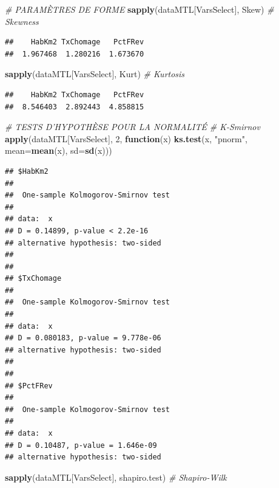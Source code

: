 \documentclass[
  11pt,
  french,
]{book}
\makeatletter
\newenvironment{Shaded}{\begin{snugshade}}{\end{snugshade}}
\newcommand{\CommentTok}[1]{\textcolor[rgb]{0.56,0.35,0.01}{\textit{#1}}}
\newcommand{\ControlFlowTok}[1]{\textcolor[rgb]{0.13,0.29,0.53}{\textbf{#1}}}
\newcommand{\DataTypeTok}[1]{\textcolor[rgb]{0.13,0.29,0.53}{#1}}
\newcommand{\DecValTok}[1]{\textcolor[rgb]{0.00,0.00,0.81}{#1}}
\newcommand{\KeywordTok}[1]{\textcolor[rgb]{0.13,0.29,0.53}{\textbf{#1}}}
\newcommand{\NormalTok}[1]{#1}
\newcommand{\StringTok}[1]{\textcolor[rgb]{0.31,0.60,0.02}{#1}}
\newenvironment{kframe}{%
\medskip{}
\setlength{\fboxsep}{.8em}
 \def\at@end@of@kframe{}%
 \ifinner\ifhmode%
  \def\at@end@of@kframe{\end{minipage}}%
  \begin{minipage}{\columnwidth}%
 \fi\fi%
 \def\FrameCommand##1{\hskip\@totalleftmargin \hskip-\fboxsep
 \colorbox{shadecolor}{##1}\hskip-\fboxsep
     \hskip-\linewidth \hskip-\@totalleftmargin \hskip\columnwidth}%
 \MakeFramed {\advance\hsize-\width
   \@totalleftmargin\z@ \linewidth\hsize
   \@setminipage}}%
 {\par\unskip\endMakeFramed%
 \at@end@of@kframe}
\renewenvironment{Shaded}{\begin{kframe}}{\end{kframe}}
\makeatother
\begin{document}
\begin{Shaded}
\begin{Highlighting}[]
\CommentTok{# PARAMÈTRES DE FORME}
\KeywordTok{sapply}\NormalTok{(dataMTL[VarsSelect], Skew)    }\CommentTok{# Skewness}
\end{Highlighting}
\end{Shaded}

\begin{verbatim}
##    HabKm2 TxChomage   PctFRev 
##  1.967468  1.280216  1.673670
\end{verbatim}

\begin{Shaded}
\begin{Highlighting}[]
\KeywordTok{sapply}\NormalTok{(dataMTL[VarsSelect], Kurt)    }\CommentTok{# Kurtosis}
\end{Highlighting}
\end{Shaded}

\begin{verbatim}
##    HabKm2 TxChomage   PctFRev 
##  8.546403  2.892443  4.858815
\end{verbatim}

\begin{Shaded}
\begin{Highlighting}[]
\CommentTok{# TESTS D'HYPOTHÈSE POUR LA NORMALITÉ}
\CommentTok{# K-Smirnov}
\KeywordTok{apply}\NormalTok{(dataMTL[VarsSelect], }\DecValTok{2}\NormalTok{, }\ControlFlowTok{function}\NormalTok{(x) }\KeywordTok{ks.test}\NormalTok{(x, }\StringTok{"pnorm"}\NormalTok{, }\DataTypeTok{mean=}\KeywordTok{mean}\NormalTok{(x), }\DataTypeTok{sd=}\KeywordTok{sd}\NormalTok{(x)))}
\end{Highlighting}
\end{Shaded}

\begin{verbatim}
## $HabKm2
## 
## 	One-sample Kolmogorov-Smirnov test
## 
## data:  x
## D = 0.14899, p-value < 2.2e-16
## alternative hypothesis: two-sided
## 
## 
## $TxChomage
## 
## 	One-sample Kolmogorov-Smirnov test
## 
## data:  x
## D = 0.080183, p-value = 9.778e-06
## alternative hypothesis: two-sided
## 
## 
## $PctFRev
## 
## 	One-sample Kolmogorov-Smirnov test
## 
## data:  x
## D = 0.10487, p-value = 1.646e-09
## alternative hypothesis: two-sided
\end{verbatim}

\begin{Shaded}
\begin{Highlighting}[]
\KeywordTok{sapply}\NormalTok{(dataMTL[VarsSelect], shapiro.test)       }\CommentTok{# Shapiro-Wilk}
\end{Highlighting}
\end{Shaded}
\end{document}
